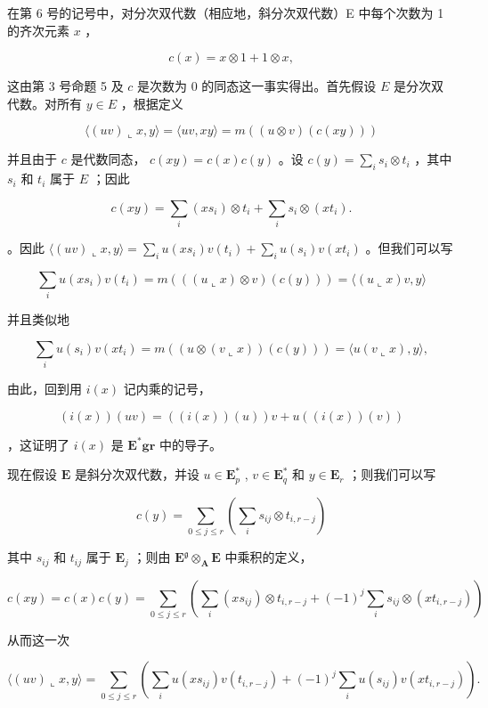 在第 6 号的记号中，对分次双代数（相应地，斜分次双代数）E 中每个次数为 1 的齐次元素 \(x\) ，

\[
c (x) = x \otimes 1 + 1 \otimes x,
\]

这由第 3 号命题 5 及 \(c\) 是次数为 0 的同态这一事实得出。首先假设 \(E\) 是分次双代数。对所有 \(y \in E\) ，根据定义

\[
\langle (u v) \llcorner x, y \rangle = \langle u v, x y \rangle = m ((u \otimes v) (c (x y)))
\]

并且由于 \(c\) 是代数同态， \(c(xy) = c(x)c(y)\) 。设 \(c(y) = \sum_{i} s_i \otimes t_i\) ，其中 \(s_i\) 和 \(t_i\) 属于 \(E\) ；因此

\[
c (x y) = \sum_ {i} (x s _ {i}) \otimes t _ {i} + \sum_ {i} s _ {i} \otimes (x t _ {i}).
\]

。因此 \(\langle (uv) \llcorner x, y \rangle = \sum_{i} u(xs_i)v(t_i) + \sum_{i} u(s_i)v(xt_i)\) 。但我们可以写

\[
\sum_ {i} u (x s _ {i}) v (t _ {i}) = m (((u \llcorner x) \otimes v) (c (y))) = \langle (u \llcorner x) v, y \rangle
\]

并且类似地

\[
\sum_ {i} u (s _ {i}) v (x t _ {i}) = m ((u \otimes (v \llcorner x)) (c (y))) = \langle u (v \llcorner x), y \rangle ,
\]

由此，回到用 \(i(x)\) 记内乘的记号，

\[
(i (x)) (u v) = ((i (x)) (u)) v + u ((i (x)) (v))\tag{64}
\]

，这证明了 \(i(x)\) 是 \(\mathbf{E}^{*}\mathbf{gr}\) 中的导子。

现在假设 \(\mathbf{E}\) 是斜分次双代数，并设 \(u\in \mathbf{E}_p^*\) , \(v\in \mathbf{E}_q^*\) 和 \(y\in \mathbf{E}_r\) ；则我们可以写

\[
c (y) = \sum_ {0 \leqslant j \leqslant r} \left(\sum_ {i} s _ {i j} \otimes t _ {i, r - j}\right)
\]

其中 \(s_{ij}\) 和 \(t_{ij}\) 属于 \(\mathbf{E}_j\) ；则由 \(\mathbf{E}^{\mathfrak{g}} \otimes_{\mathbf{A}} \mathbf{E}\) 中乘积的定义，

\[
c (x y) = c (x) c (y) = \sum_ {0 \leqslant j \leqslant r} \left(\sum_ {i} \left(x s _ {i j}\right) \otimes t _ {i, r - j} + (- 1) ^ {j} \sum_ {i} s _ {i j} \otimes \left(x t _ {i, r - j}\right)\right)
\]

从而这一次

\[
\langle (u v) \llcorner x, y \rangle = \sum_ {0 \leqslant j \leqslant r} \left(\sum_ {i} u \left(x s _ {i j}\right) v \left(t _ {i, r - j}\right) + (- 1) ^ {j} \sum_ {i} u \left(s _ {i j}\right) v \left(x t _ {i, r - j}\right)\right).
\]

